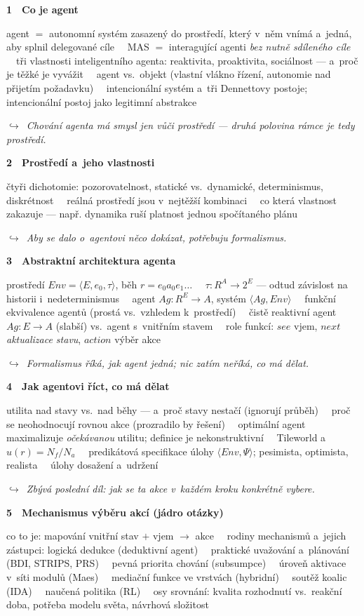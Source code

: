 \documentclass[11pt,a4paper]{article}
\newcommand{\tb}{\ \textcolor{defframe}{\textbullet}\ }
\newcommand{\blok}[2]{\par\addvspace{2.4mm}\noindent
  \textcolor{blokcol}{\textbf{#1}}\ \ \textbf{#2}\par\nobreak}
\newcommand{\tema}[1]{\par\nobreak\noindent #1\par}
\newcommand{\most}[1]{\par\nobreak\noindent
  {\small\itshape\textcolor{mostcol}{$\hookrightarrow$\ #1}}\par}
\begin{document}
\blok{1}{Co je agent}
\tema{agent $=$ autonomní systém zasazený do prostředí, který v~něm vnímá a~jedná, aby
splnil delegované cíle
\tb MAS $=$ interagující agenti \emph{bez nutně sdíleného cíle}
\tb tři vlastnosti inteligentního agenta: reaktivita, proaktivita, sociálnost --- a~proč je
těžké je vyvážit
\tb agent vs.\ objekt (vlastní vlákno řízení, autonomie nad přijetím požadavku)
\tb intencionální systém a~tři Dennettovy postoje; intencionální postoj jako legitimní
abstrakce}
\most{Chování agenta má smysl jen vůči prostředí --- druhá polovina rámce je tedy prostředí.}

\blok{2}{Prostředí a~jeho vlastnosti}
\tema{čtyři dichotomie: pozorovatelnost, statické vs.\ dynamické, determinismus, diskrétnost
\tb reálná prostředí jsou v~nejtěžší kombinaci
\tb co která vlastnost zakazuje --- např. dynamika ruší platnost jednou spočítaného plánu}
\most{Aby se dalo o~agentovi něco dokázat, potřebuju formalismus.}

\blok{3}{Abstraktní architektura agenta}
\tema{prostředí $\mathit{Env}=\langle E,e_0,\tau\rangle$, běh $r=e_0a_0e_1\dots$
\tb $\tau: R^A \to 2^E$ --- odtud závislost na historii i~nedeterminismus
\tb agent $Ag: R^E \to A$, systém $\langle Ag,\mathit{Env}\rangle$
\tb funkční ekvivalence agentů (prostá vs.\ vzhledem k~prostředí)
\tb čistě reaktivní agent $Ag: E \to A$ (slabší) vs.\ agent s~vnitřním stavem
\tb role funkcí: $\mathit{see}$ vjem, $\mathit{next}$ \emph{aktualizace stavu},
$\mathit{action}$ výběr akce}
\most{Formalismus říká, \emph{jak} agent jedná; nic zatím neříká, \emph{co} má dělat.}

\blok{4}{Jak agentovi říct, co má dělat}
\tema{utilita nad stavy vs.\ nad běhy --- a~proč stavy nestačí (ignorují průběh)
\tb proč se neohodnocují rovnou akce (prozradilo by řešení)
\tb optimální agent maximalizuje \emph{očekávanou} utilitu; definice je nekonstruktivní
\tb Tileworld a~$u(r)=N_f/N_a$
\tb predikátová specifikace úlohy $\langle \mathit{Env},\Psi\rangle$; pesimista, optimista,
realista
\tb úlohy dosažení a~udržení}
\most{Zbývá poslední díl: jak se ta akce v~každém kroku konkrétně vybere.}

\blok{5}{Mechanismus výběru akcí (jádro otázky)}
\tema{co to je: mapování vnitřní stav $+$ vjem $\to$ akce
\tb rodiny mechanismů a~jejich zástupci: logická dedukce (deduktivní agent) \tb praktické
uvažování a~plánování (BDI, STRIPS, PRS) \tb pevná priorita chování (subsumpce) \tb úroveň
aktivace v~síti modulů (Maes) \tb mediační funkce ve vrstvách (hybridní) \tb soutěž koalic
(IDA) \tb naučená politika (RL)
\tb osy srovnání: kvalita rozhodnutí vs.\ reakční doba, potřeba modelu světa, návrhová
složitost}
\end{document}
